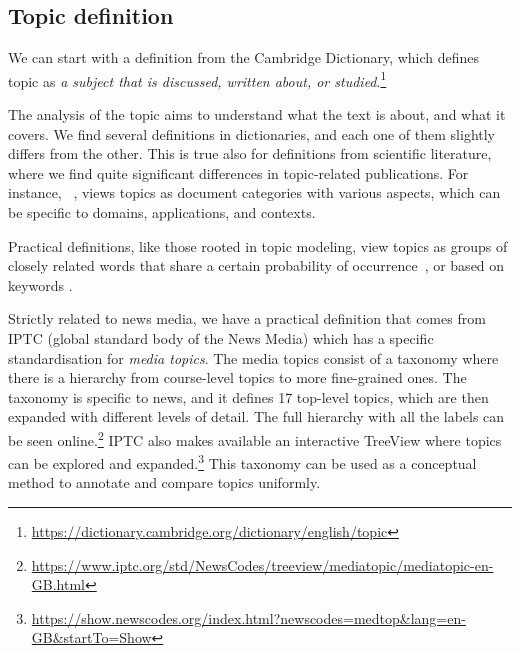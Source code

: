 
\subsection{\statusgreen Topic definition}
\label{sec:lit_topics_def}

We can start with a definition from the Cambridge Dictionary, which defines topic as \emph{a subject that is discussed, written about, or studied}.\footnote{\url{https://dictionary.cambridge.org/dictionary/english/topic}}

The analysis of the topic aims to understand what the text is about, and what it covers. We find several definitions in dictionaries, and each one of them slightly differs from the other.
This is true also for definitions from scientific literature, where we find quite significant differences in topic-related publications.
For instance, %
~\citet{ding2011community}, views topics as document categories with various aspects, which can be specific to domains, applications, and contexts.

Practical definitions, like those rooted in topic modeling, view topics as groups of closely related words that share a certain probability of occurrence~\citep{blei2003latent,blei2006correlated,blei2012probabilistic}, or based on keywords \citep{erten2004exploring,decker2007detection}.


Strictly related to news media, we have a practical definition that comes from IPTC (global standard body of the News Media) which has a specific standardisation for \emph{media topics}.
The media topics consist of a taxonomy where there is a hierarchy from course-level topics to more fine-grained ones.
The taxonomy is specific to news, and it defines 17 top-level topics, which are then expanded with different levels of detail.
The full hierarchy with all the labels can be seen online.\footnote{\url{https://www.iptc.org/std/NewsCodes/treeview/mediatopic/mediatopic-en-GB.html}}
IPTC also makes available an interactive TreeView where topics can be explored and expanded.\footnote{\url{https://show.newscodes.org/index.html?newscodes=medtop&lang=en-GB&startTo=Show}}
This taxonomy can be used as a conceptual method to annotate and compare topics uniformly.

